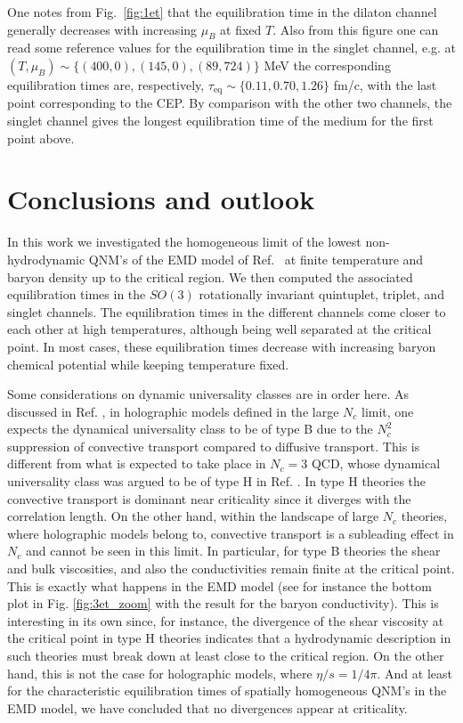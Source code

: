 \documentclass[aps,prd,showkeys,superscriptaddress,singlecolumn,nofootinbib,floatfix]{revtex4-1}
\begin{document}
One notes from Fig.\ \ref{fig:1et} that the equilibration time in the dilaton channel generally decreases with increasing $\mu_B$ at fixed $T$. Also from this figure one can read some reference values for the equilibration time in the singlet channel, e.g. at $(T,\mu_B)\sim\{(400,0),(145,0),(89,724)\}$ MeV the corresponding equilibration times are, respectively, $\tau_{\textrm{eq}}\sim\{0.11,0.70,1.26\}$ fm/c, with the last point corresponding to the CEP. By comparison with the other two channels, the singlet channel gives the longest equilibration time of the medium for the first point above.




\section{Conclusions and outlook}
\label{sec:conclusion}

In this work we investigated the homogeneous limit of the lowest non-hydrodynamic QNM's of the EMD model of Ref.\ \cite{Critelli:2017oub} at finite temperature and baryon density up to the critical region. We then computed the associated equilibration times in the $SO(3)$ rotationally invariant quintuplet, triplet, and singlet channels. The equilibration times in the different channels come closer to each other at high temperatures, although being well separated at the critical point. In most cases, these equilibration times decrease with increasing baryon chemical potential while keeping temperature fixed.

Some considerations on dynamic universality classes \cite{Hohenberg:1977ym} are in order here. As discussed in Ref. \cite{Natsuume:2010bs}, in holographic models defined in the large $N_c$ limit, one expects the dynamical universality class to be of type B due to the $N_c^2$ suppression of convective transport compared to diffusive transport. This is different from what is expected to take place in $N_c=3$ QCD, whose dynamical universality class was argued to be of type H in Ref. \cite{Son:2004iv}. In type H theories the convective transport is dominant near criticality since it diverges with the correlation length. On the other hand, within the landscape of large $N_c$ theories, where holographic models belong to, convective transport is a subleading effect in $N_c$ and cannot be seen in this limit. In particular, for type B theories the shear and bulk viscosities, and also the conductivities remain finite at the critical point. This is exactly what happens in the EMD model (see for instance the bottom plot in Fig. \ref{fig:3et_zoom} with the result for the baryon conductivity). This is interesting in its own since, for instance, the divergence of the shear viscosity at the critical point in type H theories indicates that a hydrodynamic description in such theories must break down at least close to the critical region. On the other hand, this is not the case for holographic models, where $\eta/s=1/4\pi$. And at least for the characteristic equilibration times of spatially homogeneous QNM's in the EMD model, we have concluded that no divergences appear at criticality.
\end{document}
